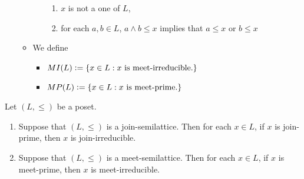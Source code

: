 \documentclass{book}
\begin{document}
\begin{defn}
\begin{itemize}
\begin{itemize}
\begin{itemize}
\begin{enumerate}
						\item $x$ is not a one of $L$,
						\item for each $a,b \in L$, $a \wedge b \leq x$ implies that $a \leq x$ or $b \leq x$
					\end{enumerate}
				\end{itemize}
				\item We define 
				\begin{itemize}
					\item $MI(L) \vcentcolon= \{x \in L: \text{$x$ is meet-irreducible.}\}$
					\item $MP(L) \vcentcolon= \{x \in L: \text{$x$ is meet-prime.}\}$
				\end{itemize}
			\end{itemize}
		\end{itemize}
	\end{defn}
	
	\begin{ex}
		Let $(L, \leq)$ be a poset. 
		\begin{enumerate}
			\item Suppose that $(L, \leq)$ is a join-semilattice. Then for each $x \in L$, if $x$ is join-prime, then $x$ is join-irreducible. 
			\item Suppose that $(L, \leq)$ is a meet-semilattice. Then for each $x \in L$, if $x$ is meet-prime, then $x$ is meet-irreducible. 
		\end{enumerate}
	\end{ex}
	
\end{document}
